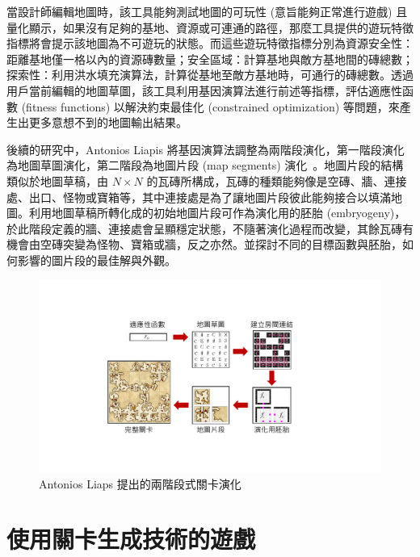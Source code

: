 當設計師編輯地圖時，該工具能夠測試地圖的可玩性 (意旨能夠正常進行遊戲) 且量化顯示，如果沒有足夠的基地、資源或可連通的路徑，那麼工具提供的遊玩特徵指標將會提示該地圖為不可遊玩的狀態。而這些遊玩特徵指標分別為資源安全性：距離基地僅一格以內的資源磚數量；安全區域：計算基地與敵方基地間的磚總數；探索性：利用洪水填充演算法，計算從基地至敵方基地時，可通行的磚總數。透過用戶當前編輯的地圖草圖，該工具利用基因演算法進行前述等指標，評估適應性函數 (fitness functions) 以解決約束最佳化 (constrained optimization) 等問題，來產生出更多意想不到的地圖輸出結果。

後續的研究中，Antonios Liapis 將基因演算法調整為兩階段演化，第一階段演化為地圖草圖演化，第二階段為地圖片段 (map segments) 演化~\cite{liapis2017multi}。地圖片段的結構類似於地圖草稿，由 $N\times N$ 的瓦磚所構成，瓦磚的種類能夠像是空磚、牆、連接處、出口、怪物或寶箱等，其中連接處是為了讓地圖片段彼此能夠接合以填滿地圖。利用地圖草稿所轉化成的初始地圖片段可作為演化用的胚胎 (embryogeny)，於此階段定義的牆、連接處會呈顯穩定狀態，不隨著演化過程而改變，其餘瓦磚有機會由空磚突變為怪物、寶箱或牆，反之亦然。並探討不同的目標函數與胚胎，如何影響的圖片段的最佳解與外觀。

\begin{figure}[!htb]
  \begin{center}
    \includegraphics[width=1.0\textwidth]{figures/Multi-segment演化框架.pdf}
    \caption{Antonios Liaps 提出的兩階段式關卡演化} 
    \label{fig:multi-segment-evolution}
  \end{center}
\end{figure}

\section{使用關卡生成技術的遊戲}
\label{sec:relatedworks-gameswithprocedural}

